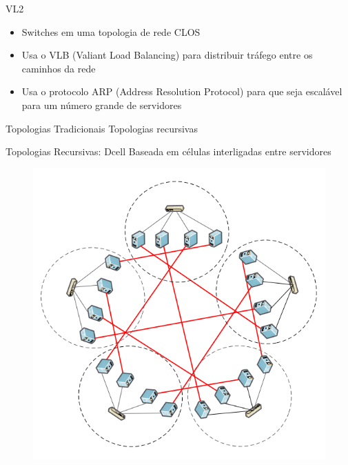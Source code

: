 \documentclass[aspectratio=169]{beamer}
\begin{document}
      
       \begin{frame} {VL2}


         \begin{itemize}
             \Large
             \item
                 Switches em uma topologia de rede CLOS
         
             \item
                 Usa o VLB (Valiant Load Balancing) para distribuir tráfego entre os caminhos da rede
         
              \item
                 Usa o protocolo ARP (Address Resolution Protocol) para que seja escalável para um número grande de servidores
                         
              
         \end{itemize}
  
       
       \end{frame}
    
    	\begin{frame} {Topologias Tradicionais}
			Topologias recursivas
		\end{frame}

		\begin{frame} {Topologias Recursivas: Dcell}
			Baseada em células interligadas entre servidores
			\begin{figure}[ht]    
				\includegraphics[scale=0.3]{imagens/dcell.png}
				\label{fig:sample_figure}
			\end{figure}
		\end{frame}
\end{document}
